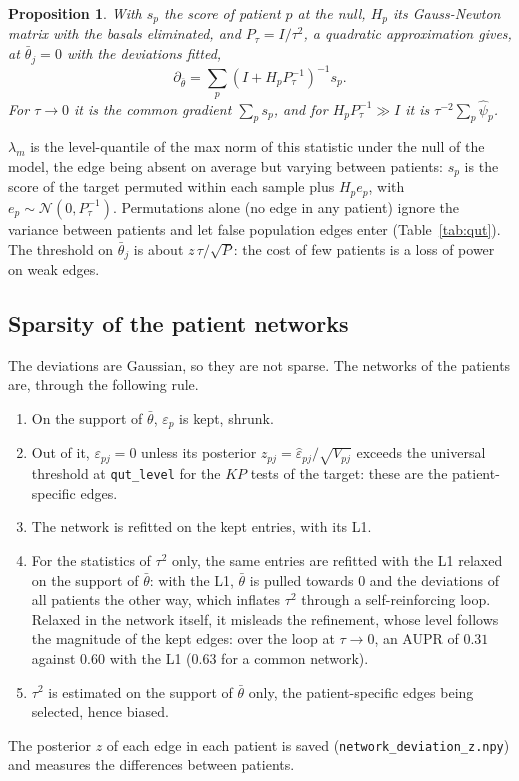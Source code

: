 \documentclass[a4paper, 11pt]{article}
\newcommand{\tb}{\bar\theta}
\theoremstyle{plain}
\newtheorem{prop}{Proposition}
\theoremstyle{remark}
\begin{document}
\begin{prop}\label{prop:qut}
With $s_p$ the score of patient $p$ at the null, $H_p$ its Gauss-Newton matrix with the basals eliminated, and $P_\tau = I / \tau^2$, a quadratic approximation gives, at $\tb_j = 0$ with the deviations fitted,
\begin{equation}
\partial_{\tb} = \sum_p (I + H_p P_\tau^{-1})^{-1} s_p .
\end{equation}
For $\tau \to 0$ it is the common gradient $\sum_p s_p$, and for $H_p P_\tau^{-1} \gg I$ it is $\tau^{-2} \sum_p \hat\psi_p$.
\end{prop}

$\lambda_m$ is the level-quantile of the max norm of this statistic under the null of the model, the edge being absent on average but varying between patients: $s_p$ is the score of the target permuted within each sample plus $H_p e_p$, with $e_p \sim \mathcal N(0, P_\tau^{-1})$. Permutations alone (no edge in any patient) ignore the variance between patients and let false population edges enter (Table~\ref{tab:qut}). The threshold on $\tb_j$ is about $z\, \tau / \sqrt P$: the cost of few patients is a loss of power on weak edges.

\subsection{Sparsity of the patient networks}

The deviations are Gaussian, so they are not sparse. The networks of the patients are, through the following rule.
\begin{enumerate}[leftmargin=*]
\item On the support of $\tb$, $\varepsilon_p$ is kept, shrunk.
\item Out of it, $\varepsilon_{pj} = 0$ unless its posterior $z_{pj} = \hat\varepsilon_{pj} / \sqrt{V_{pj}}$ exceeds the universal threshold at \texttt{qut\_level} for the $K P$ tests of the target: these are the patient-specific edges.
\item The network is refitted on the kept entries, with its L1.
\item For the statistics of $\tau^2$ only, the same entries are refitted with the L1 relaxed on the support of $\tb$: with the L1, $\tb$ is pulled towards $0$ and the deviations of all patients the other way, which inflates $\tau^2$ through a self-reinforcing loop. Relaxed in the network itself, it misleads the refinement, whose level follows the magnitude of the kept edges: over the loop at $\tau \to 0$, an AUPR of $0.31$ against $0.60$ with the L1 ($0.63$ for a common network).
\item $\tau^2$ is estimated on the support of $\tb$ only, the patient-specific edges being selected, hence biased.
\end{enumerate}
The posterior $z$ of each edge in each patient is saved (\texttt{network\_deviation\_z.npy}) and measures the differences between patients.
\end{document}

